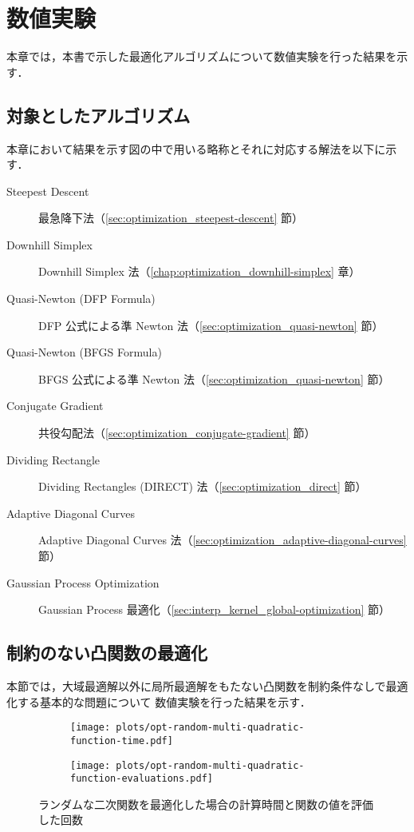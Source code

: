 %

\chapter{数値実験}

本章では，本書で示した最適化アルゴリズムについて数値実験を行った結果を示す．

\section{対象としたアルゴリズム}

本章において結果を示す図の中で用いる略称とそれに対応する解法を以下に示す．

\begin{description}
    \item[Steepest Descent] 最急降下法（\ref{sec:optimization_steepest-descent} 節）
    \item[Downhill Simplex] Downhill Simplex 法（\ref{chap:optimization_downhill-simplex} 章）
    \item[Quasi-Newton (DFP Formula)] DFP 公式による準 Newton 法（\ref{sec:optimization_quasi-newton} 節）
    \item[Quasi-Newton (BFGS Formula)] BFGS 公式による準 Newton 法（\ref{sec:optimization_quasi-newton} 節）
    \item[Conjugate Gradient] 共役勾配法（\ref{sec:optimization_conjugate-gradient} 節）
    \item[Dividing Rectangle] Dividing Rectangles (DIRECT) 法（\ref{sec:optimization_direct} 節）
    \item[Adaptive Diagonal Curves] Adaptive Diagonal Curves 法（\ref{sec:optimization_adaptive-diagonal-curves} 節）
    \item[Gaussian Process Optimization] Gaussian Process 最適化（\ref{sec:interp_kernel_global-optimization} 節）
\end{description}

\section{制約のない凸関数の最適化}

本節では，大域最適解以外に局所最適解をもたない凸関数を制約条件なしで最適化する基本的な問題について
数値実験を行った結果を示す．

\begin{figure}[tp]
    \centering
    \begin{subfigure}{0.85\linewidth}
        \centering
        \texttt{[image: plots/opt-random-multi-quadratic-function-time.pdf]}
    \end{subfigure}
    \begin{subfigure}{0.85\linewidth}
        \centering
        \texttt{[image: plots/opt-random-multi-quadratic-function-evaluations.pdf]}
    \end{subfigure}
    \caption{ランダムな二次関数を最適化した場合の計算時間と関数の値を評価した回数}
    \label{fig:optimization_unconstrained-convex-optimization_random-multi-quadratic-function}
\end{figure}

